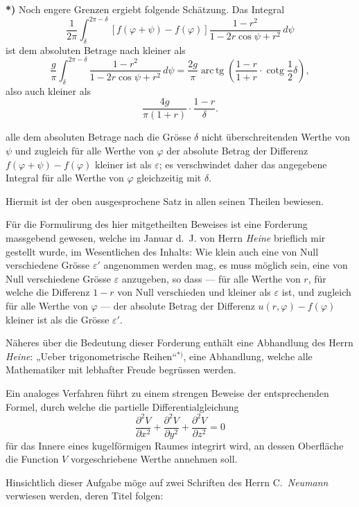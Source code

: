 \documentclass{article}
\begin{document}
\textbf{*)} Noch engere Grenzen ergiebt folgende Schätzung. Das Integral
\[
\frac{1}{2\pi} \int_{\delta}^{2\pi - \delta} [f(\varphi + \psi) - f(\varphi)] \frac{1 - r^2}{1 - 2r \cos\psi + r^2}\,d\psi
\]
ist dem absoluten Betrage nach kleiner als
\[
\frac{g}{\pi} \int_{\delta}^{2\pi - \delta} \frac{1 - r^2}{1 - 2r \cos\psi + r^2}\,d\psi = \frac{2g}{\pi} \operatorname{arc\,tg}\left(\frac{1 - r}{1 + r} \cdot \operatorname{cotg}\frac{1}{2}\delta\right),
\]
also auch kleiner als
\[
\frac{4g}{\pi(1 + r)} \cdot \frac{1 - r}{\delta}.
\]

alle dem absoluten Betrage nach die Grösse $\delta$ nicht überschreitenden Werthe von $\psi$ und zugleich für alle Werthe von $\varphi$ der absolute Betrag der Differenz $f(\varphi + \psi) - f(\varphi)$ kleiner ist als $\varepsilon$; es verschwindet daher das angegebene Integral für alle Werthe von $\varphi$ gleichzeitig mit $\delta$.

Hiermit ist der oben ausgesprochene Satz in allen seinen Theilen bewiesen.

Für die Formulirung des hier mitgetheilten Beweises ist eine Forderung massgebend gewesen, welche im Januar d.~J. von Herrn \emph{Heine} brieflich mir gestellt wurde, im Wesentlichen des Inhalts: Wie klein auch eine von Null verschiedene Grösse $\varepsilon'$ angenommen werden mag, es muss möglich sein, eine von Null verschiedene Grösse $\varepsilon$ anzugeben, so dass --- für alle Werthe von $r$, für welche die Differenz $1 - r$ von Null verschieden und kleiner als $\varepsilon$ ist, und zugleich für alle Werthe von $\varphi$ --- der absolute Betrag der Differenz $u(r, \varphi) - f(\varphi)$ kleiner ist als die Grösse $\varepsilon'$.

Näheres über die Bedeutung dieser Forderung enthält eine Abhandlung des Herrn \emph{Heine}: „Ueber trigonometrische Reihen``${}^{*)}$, eine Abhandlung, welche alle Mathematiker mit lebhafter Freude begrüssen werden.

Ein analoges Verfahren führt zu einem strengen Beweise der entsprechenden Formel, durch welche die partielle Differentialgleichung
\[
\frac{\partial^2 V}{\partial x^2} + \frac{\partial^2 V}{\partial y^2} + \frac{\partial^2 V}{\partial z^2} = 0
\]
für das Innere eines kugelförmigen Raumes integrirt wird, an dessen Oberfläche die Function $V$ vorgeschriebene Werthe annehmen soll.

Hinsichtlich dieser Aufgabe möge auf zwei Schriften des Herrn C.~\emph{Neumann} verwiesen werden, deren Titel folgen:
\end{document}
